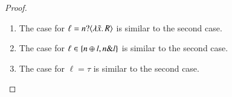 \begin{proof}
\begin{enumerate}
		\item	The case for $\ell = n ? \langle \lambda \tilde{x}.\,R \rangle$
		is similar to the second case.
		
		\item	The case for $\ell \in \{n \oplus l, n \& l\}$ is similar to the second case.
		
		\item	The case for $\ell = \tau$ is similar to the second case.
		
	\end{enumerate}
\end{proof}

